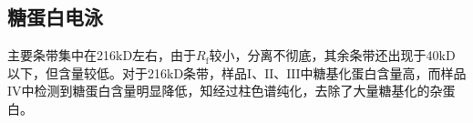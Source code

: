 
\subsection{糖蛋白电泳}
\par 主要条带集中在216kD左右，由于$R_\text{f}$较小，分离不彻底，其余条带还出现于40kD以下，但含量较低。对于216kD条带，样品$\mathrm{I}$、$\mathrm{II}$、$\mathrm{III}$中糖基化蛋白含量高，而样品$\mathrm{IV}$中检测到糖蛋白含量明显降低，知经过柱色谱纯化，去除了大量糖基化的杂蛋白。

